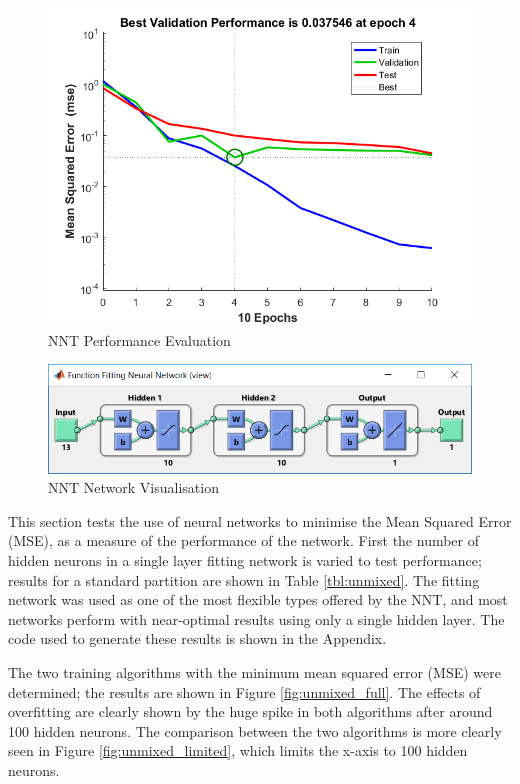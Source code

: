 \documentclass[a4paper, 10pt, conference]{ieeeconf}
\begin{document}
\begin{figure}[!ht]
    \centering
    \includegraphics[width=\linewidth]{pic/performance}
    \caption{NNT Performance Evaluation}
    \label{fig:nnt_perf}
\end{figure}

\begin{figure}[!ht]
    \centering
    \includegraphics[width=\linewidth]{pic/view_twolayer}
    \caption{NNT Network Visualisation}
    \label{fig:nnt_vis}
\end{figure}

This section tests the use of neural networks to minimise the Mean Squared Error (MSE), as a measure of the performance of the network. First the number of hidden neurons in a single layer fitting network is varied to test performance; results for a standard partition are shown in Table \ref{tbl:unmixed}. The fitting network was used as one of the most flexible types offered by the NNT, and most networks perform with near-optimal results using only a single hidden layer. The code used to generate these results is shown in the Appendix.

The two training algorithms with the minimum mean squared error (MSE) were determined; the results are shown in Figure \ref{fig:unmixed_full}. The effects of overfitting are clearly shown by the huge spike in both algorithms after around 100 hidden neurons. The comparison between the two algorithms is more clearly seen in Figure \ref{fig:unmixed_limited}, which limits the x-axis to 100 hidden neurons.
\end{document}
